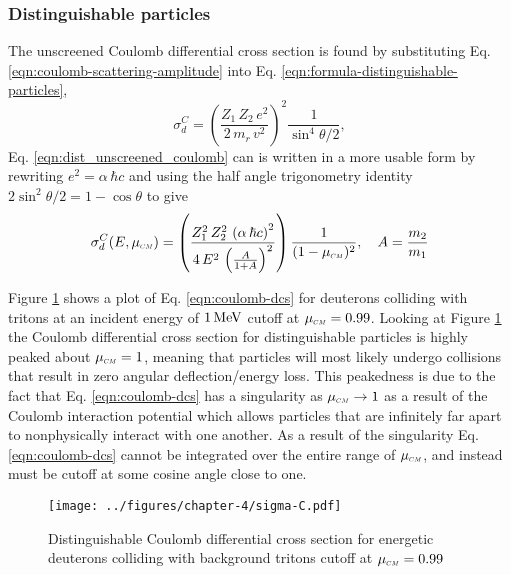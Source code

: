 \subsubsection{Distinguishable particles}
The unscreened Coulomb differential cross section is found by substituting Eq. \eqref{eqn:coulomb-scattering-amplitude} into Eq. \eqref{eqn:formula-distinguishable-particles},
\begin{equation} \label{eqn:dist_unscreened_coulomb}
    \sigma_{d}^{C} = \left(\dfrac{Z_1 \, Z_2 \, e^2}{2 \, m_r \, v^2}\right)^2 \dfrac{1}{\sin^4 \theta/2},
\end{equation}
Eq. \eqref{eqn:dist_unscreened_coulomb} can is written in a more usable form by rewriting $e^2 = \alpha \, \hbar c$ and using the half angle trigonometry identity $2 \sin^2 \theta / 2 = 1 - \cos \theta$ to give
\begin{equation} \label{eqn:coulomb-dcs}
    \sigma_{d}^{C}(E,\mucm) = \left(\dfrac{Z_1^2 \, Z_2^2 \, \left(\alpha \, \hbar c\right)^2}{ 4 \, E^2 \, \left(\frac{A}{1 + A} \right)^2}\right) \dfrac{1}{(1 - \mucm)^2}, \quad A = \dfrac{m_2}{m_1}
\end{equation}

Figure \ref{fig:sigma_c} shows a plot of Eq. \eqref{eqn:coulomb-dcs} for deuterons colliding with tritons at an incident energy of $1 \,\text{MeV}$ cutoff at $\mucm = 0.99$. Looking at Figure \ref{fig:sigma_c} the Coulomb differential cross section for distinguishable particles is highly peaked about $\mucm = 1$, meaning that particles will most likely undergo collisions that result in zero angular deflection/energy loss. This peakedness is due to the fact that Eq. \eqref{eqn:coulomb-dcs} has a singularity as $\mucm \rightarrow 1$ as a result of the Coulomb interaction potential which allows particles that are infinitely far apart to nonphysically interact with one another. As a result of the singularity Eq. \eqref{eqn:coulomb-dcs} cannot be integrated over the entire range of $\mucm$, and instead must be cutoff at some cosine angle close to one. 
\begin{figure}[!htb]
    \centering
    \texttt{[image: ../figures/chapter-4/sigma-C.pdf]}
    \caption{Distinguishable Coulomb differential cross section for energetic deuterons colliding with background tritons cutoff at $\mucm = 0.99$}
    \label{fig:sigma_c}
\end{figure}

